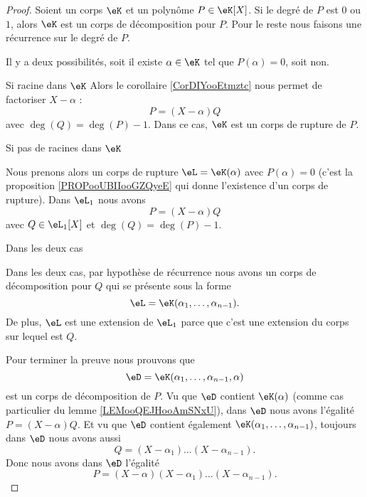 \begin{proof}
    Soient un corps \( \eK\) et un polynôme \( P\in \eK[X]\). Si le degré de \( P\) est \( 0\) ou \( 1\), alors \( \eK\) est un corps de décomposition pour \( P\). Pour le reste nous faisons une récurrence sur le degré de \( P\).

    Il y a deux possibilités, soit il existe \( \alpha\in \eK\) tel que \( P(\alpha)=0\), soit non.

    \begin{subproof}
        \item[Si racine dans \( \eK\)]
            Alors le corollaire \ref{CorDIYooEtmztc} nous permet de factoriser \( X-\alpha\) :
            \begin{equation}
                P=(X-\alpha)Q
            \end{equation}
            avec \( \deg(Q)=\deg(P)-1\). Dans ce cas, \( \eK\) est un corps de rupture de \( P\).

        \item[Si pas de racines dans \( \eK\)]
        
            Nous prenons alors un corps de rupture \( \eL=\eK(\alpha)\) avec \( P(\alpha)=0\) (c'est la proposition \ref{PROPooUBIIooGZQyeE} qui donne l'existence d'un corps de rupture). Dans \( \eL_1\) nous avons
            \begin{equation}
                P=(X-\alpha)Q
            \end{equation}
            avec \( Q\in \eL_1[X]\) et \( \deg(Q)=\deg(P)-1\).

        \item[Dans les deux cas]

            Dans les deux cas, par hypothèse de récurrence nous avons un corps de décomposition pour \( Q\) qui se présente sous la forme
            \begin{equation}
                \eL=\eK(\alpha_1,\ldots, \alpha_{n-1}).
            \end{equation}
            De plus, \( \eL\) est une extension de \( \eL_1\) parce que c'est une extension du corps sur lequel est \( Q\).
            
    \end{subproof}
    Pour terminer la preuve nous prouvons que 
    \begin{equation}
        \eD=\eK(\alpha_1,\ldots, \alpha_{n-1},\alpha)
    \end{equation}
    est un corps de décomposition de \( P\). Vu que \( \eD\) contient \( \eK(\alpha)\) (comme cas particulier du lemme \ref{LEMooQEJHooAmSNxU}), dans \( \eD\) nous avons l'égalité \( P=(X-\alpha)Q\). Et vu que \( \eD\) contient également \( \eK(\alpha_1,\ldots, \alpha_{n-1})\), toujours dans \( \eD\) nous avons aussi
    \begin{equation}
         Q=(X-\alpha_1)\ldots(X-\alpha_{n-1}).
    \end{equation}
    Donc nous avons dans \( \eD\) l'égalité
    \begin{equation}
        P=(X-\alpha)(X-\alpha_1)\ldots (X-\alpha_{n-1}).
    \end{equation}
\end{proof}

